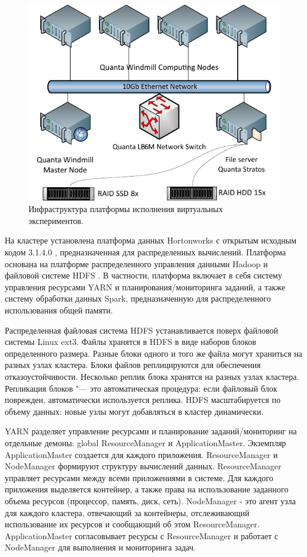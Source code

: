 \begin{figure}[h!]
    \centering
    \includegraphics[width=0.7\linewidth]{images/lab_cluster.pdf}
    \caption{Инфраструктура платформы исполнения виртуальных экспериментов.}\label{fig:lab_cluster}
\end{figure}

На кластере установлена платформа данных Hortonworks с открытым исходным кодом 3.1.4.0 \cite{HDP2021}, 
предназначенная для распределенных вычислений. Платформа основана на платформе распределенного управления 
данными Hadoop \cite{hadoop} и файловой системе HDFS \cite{borthakur2007hadoop}. В частности, платформа включает 
в себя систему управления ресурсами YARN и планирования/мониторинга заданий, а также систему обработки данных Spark, 
предназначенную для распределенного использования общей памяти. 

Распределенная файловая система HDFS устанавливается поверх файловой системы Linux ext3. Файлы хранятся в HDFS в 
виде наборов блоков определенного размера. Разные блоки одного и того же файла могут храниться на разных узлах 
кластера. Блоки файлов реплицируются для обеспечения отказоустойчивости. Несколько реплик блока хранятся на разных 
узлах кластера. Репликация блоков "--- это автоматическая процедура: если файловый блок поврежден, автоматически 
используется реплика. HDFS масштабируется по объему данных: новые узлы могут добавляться в кластер динамически. 

YARN разделяет управление ресурсами и планирование заданий/мониторинг на отдельные демоны: global ResourceManager и 
ApplicationMaster. Экземпляр ApplicationMaster создается для каждого приложения. ResourceManager и NodeManager 
формируют структуру вычислений данных. ResourceManager управляет ресурсами между всеми приложениями в системе. 
Для каждого приложения выделяется контейнер, а также права на использование заданного объема ресурсов (процессор, 
память, диск, сеть). NodeManager - это агент узла для каждого кластера, отвечающий за контейнеры, отслеживающий 
использование их ресурсов и сообщающий об этом ResourceManager. ApplicationMaster согласовывает ресурсы с 
ResourceManager и работает с NodeManager для выполнения и мониторинга задач.

